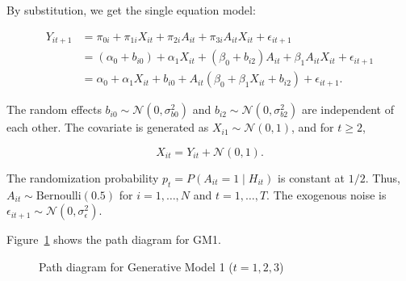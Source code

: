 \documentclass[
  12pt,
  a4paper,
]{article}
\begin{document}
By substitution, we get the single equation model:

\[
\begin{aligned}
Y_{it+1} &= \pi_{0i} + \pi_{1i} X_{it} + \pi_{2i} A_{it} + \pi_{3i} A_{it} X_{it} + \epsilon_{it+1} \\
&= (\alpha_0 + b_{i0}) + \alpha_1 X_{it} + (\beta_0 + b_{i2}) A_{it} + \beta_1 A_{it} X_{it} + \epsilon_{it+1} \\
&= \alpha_0 + \alpha_1 X_{it} + b_{i0} + A_{it} (\beta_0 + \beta_1 X_{it} + b_{i2}) + \epsilon_{it+1}.
\end{aligned}
\]

The random effects \(b_{i0} \sim \mathcal{N}(0, \sigma_{b0}^2)\) and
\(b_{i2} \sim \mathcal{N}(0, \sigma_{b2}^2)\) are independent of each
other. The covariate is generated as \(X_{i1} \sim \mathcal{N}(0, 1)\),
and for \(t \geq 2\),

\[
X_{it} = Y_{it} + \mathcal{N}(0, 1).
\]

The randomization probability \(p_t = P(A_{it} = 1 \mid H_{it})\) is
constant at \(1/2\). Thus, \(A_{it} \sim \text{Bernoulli}(0.5)\) for
\(i = 1, \ldots, N\) and \(t = 1, \ldots, T\). The exogenous noise is
\(\epsilon_{it+1} \sim \mathcal{N}(0, \sigma_\epsilon^2)\).

Figure~\ref{fig-GM1_path} shows the path diagram for GM1.

\begin{figure}[H]

\caption{\label{fig-GM1_path}Path diagram for Generative Model 1
(\(t = 1, 2, 3\))}


\end{figure}%
\end{document}
